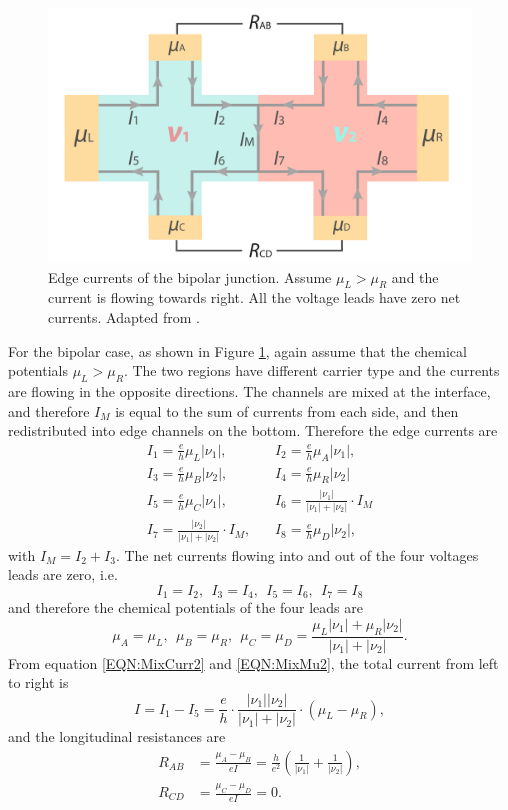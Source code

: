 \documentclass[pdflatex, sectionletters, 12pt, final, phd]{pittetd}    %
\begin{document}
\begin{figure}[h!]
	\centering
	\includegraphics[width=.7\textwidth]{Drawing/Bipolar.pdf}
	\caption[Edge currents of the bipolar junction]{Edge currents of the bipolar junction. Assume $\mu_L > \mu_R$ and the current is flowing towards right. All the voltage leads have zero net currents. Adapted from \cite{li2019reconfigurable}.}
	\label{FIG:Bipolar}
\end{figure}

For the bipolar case, as shown in Figure \ref{FIG:Bipolar}, again assume that the chemical potentials $\mu_L > \mu_R$. The two regions have different carrier type and the currents are flowing in the opposite directions. The channels are mixed at the interface, and therefore $I_M$ is equal to the sum of currents from each side, and then redistributed into edge channels on the bottom. Therefore the edge currents are
\begin{equation}
\label{EQN:MixCurr2}
\begin{split}
I_1 = \frac{e}{h}\mu_L|\nu_1|, & \ \ \ \   I_2 = \frac{e}{h}\mu_A|\nu_1|, \\
I_3 = \frac{e}{h}\mu_B|\nu_2|, & \ \ \ \ I_4 = \frac{e}{h}\mu_R|\nu_2| \\
I_5 = \frac{e}{h}\mu_C|\nu_1|, & \ \ \ \  I_6 = \frac{|\nu_1|}{|\nu_1|+|\nu_2|} \cdot I_M \\
I_7 = \frac{|\nu_2|}{|\nu_1|+|\nu_2|} \cdot I_M, & \ \ \ \ I_8 = \frac{e}{h}\mu_D|\nu_2|,
\end{split}
\end{equation}
with $I_M = I_2 + I_3$. The net currents flowing into and out of the four voltages leads are zero, i.e.
$$
I_1 = I_2, \ \ I_3 = I_4, \ \ I_5 = I_6, \ \ I_7 = I_8
$$
and therefore the chemical potentials of the four leads are
\begin{equation}
\label{EQN:MixMu2}
\mu_A = \mu_L, \ \ \mu_B = \mu_R, \ \ \mu_C = \mu_D = \frac{\mu_L|\nu_1| + \mu_R|\nu_2|}{|\nu_1| + |\nu_2|}.
\end{equation}
From equation \ref{EQN:MixCurr2} and \ref{EQN:MixMu2}, the total current from left to right is 
$$
I = I_1 - I_5 = \frac{e}{h} \cdot \frac{|\nu_1||\nu_2|}{|\nu_1| + |\nu_2|} \cdot (\mu_L - \mu_R),
$$ 
and the longitudinal resistances are 
\begin{equation}
\label{EQN:Mixing2}
\begin{split}
R_{AB} & = \frac{\mu_A - \mu_B}{eI} = \frac{h}{e^2}\left(\frac{1}{|\nu_1|} + \frac{1}{|\nu_2|}\right), \\
R_{CD} & = \frac{\mu_C - \mu_D}{eI} = 0.
\end{split}
\end{equation}
\end{document}
